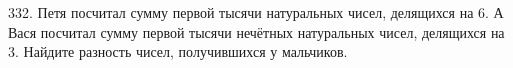 332. Петя посчитал сумму первой тысячи натуральных чисел, делящихся на 6. А Вася посчитал сумму первой тысячи нечётных натуральных чисел, делящихся на 3. Найдите разность чисел, получившихся у мальчиков.\\
